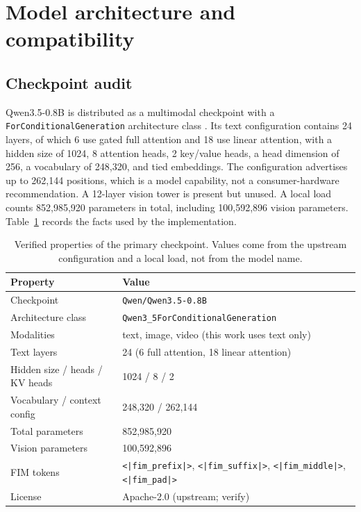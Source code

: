 \section{Model architecture and compatibility}
\label{sec:architecture}

\subsection{Checkpoint audit}

Qwen3.5-0.8B is distributed as a multimodal checkpoint with a
\texttt{ForConditionalGeneration} architecture class \citep{qwen35_model_card}. Its text
configuration contains 24 layers, of which 6 use gated full attention and 18 use
linear attention, with a hidden size of 1024, 8 attention heads, 2 key/value
heads, a head dimension of 256, a vocabulary of 248,320, and tied embeddings.
The configuration advertises up to 262,144 positions, which is a model capability,
not a consumer-hardware recommendation. A 12-layer vision tower is present but
unused. A local load counts 852,985,920 parameters in total, including
100,592,896 vision parameters. Table~\ref{tab:model-facts} records the facts used
by the implementation.

\begin{table}[t]
\centering
\small
\caption{Verified properties of the primary checkpoint. Values come from the
upstream configuration and a local load, not from the model name.}
\label{tab:model-facts}
\begin{tabular}{@{}ll@{}}
\toprule
Property & Value \\
\midrule
Checkpoint & \texttt{Qwen/Qwen3.5-0.8B} \\
Architecture class & \texttt{Qwen3\_5ForConditionalGeneration} \\
Modalities & text, image, video (this work uses text only) \\
Text layers & 24 (6 full attention, 18 linear attention) \\
Hidden size / heads / KV heads & 1024 / 8 / 2 \\
Vocabulary / context config & 248,320 / 262,144 \\
Total parameters & 852,985,920 \\
Vision parameters & 100,592,896 \\
FIM tokens & \texttt{<|fim\_prefix|>}, \texttt{<|fim\_suffix|>}, \texttt{<|fim\_middle|>}, \texttt{<|fim\_pad|>} \\
License & Apache-2.0 (upstream; verify) \\
\bottomrule
\end{tabular}
\end{table}

